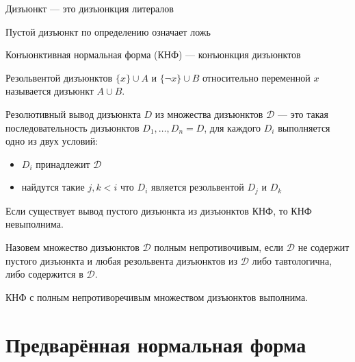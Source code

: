 \documentclass[11pt]{article}
\begin{document}
\begin{definition}
    Дизъюнкт --- это дизъюнкция литералов
\end{definition}

\begin{remark}
    Пустой дизъюнкт по определению означает ложь
\end{remark}

\begin{definition}
    Конъюнктивная нормальная форма (КНФ) --- конъюнкция дизъюнктов
\end{definition}

\begin{definition}
    Резольвентой дизъюнктов $\{x\} \cup A$ и $\{\lnot x\} \cup B$ относительно переменной
    $x$ называется дизъюнкт $A \cup B$.
\end{definition}

\begin{definition}
    Резолютивный вывод дизъюнкта $D$ из множества дизъюнктов $\mathcal{D}$ --- это такая
    последовательность дизъюнктов $D_1, \dots, D_n = D$, для каждого $D_i$ выполняется одно из двух условий:
    \begin{itemize}
        \item $D_i$ принадлежит $\mathcal{D}$
        \item найдутся такие $j, k < i$ что $D_i$ является резольвентой $D_j$ и $D_k$
    \end{itemize}
\end{definition}

\begin{theorem}
    Если существует вывод пустого дизъюнкта из дизъюнктов КНФ, то КНФ невыполнима.
\end{theorem}

\begin{definition}
    Назовем множество дизъюнктов $\mathcal{D}$ полным непротивочивым, если $\mathcal{D}$
    не содержит пустого дизъюнкта и любая резольвента дизъюнктов из $\mathcal{D}$
    либо тавтологична, либо содержится в $\mathcal{D}$.
\end{definition}

\begin{theorem}[Выполнимость]
    КНФ с полным непротиворечивым множеством дизъюнктов выполнима.
\end{theorem}

\section{Предварённая нормальная форма}
\end{document}
